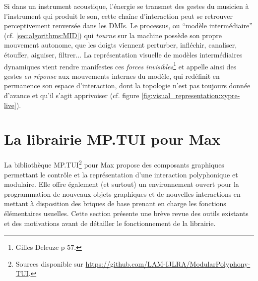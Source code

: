 \noindent Si dans un instrument acoustique, l'énergie se transmet des gestes du musicien à l'instrument qui produit le son, cette chaîne d'interaction peut se retrouver perceptivement renversée dans les \glspl{DMI}. Le processus, ou ``modèle intermédiaire'' (cf. \ref{sec:algorithms:MID}) qui \textit{tourne} sur la machine possède son propre mouvement autonome, que les doigts viennent perturber, infléchir, canaliser, étouffer, aiguiser, filtrer... La représentation visuelle de modèles intermédiaires dynamiques vient rendre manifestes ces \textit{forces invisibles}\footnote{ Gilles Deleuze \cite{deleuze_francis_1981} p 57.} et appelle ainsi des gestes \textit{en réponse} aux mouvements internes du modèle, qui redéfinit en permanence son espace d'interaction, dont la topologie n'est pas toujours donnée d'avance et qu'il s'agit apprivoiser (cf. figure \ref{fig:visual_representation:xypre-live}).




\section{La librairie MP.TUI pour Max}


\noindent La bibliothèque MP.TUI\footnote{Sources disponible sur \url{https://github.com/LAM-IJLRA/ModularPolyphony-TUI}.} pour Max propose des composants graphiques permettant le contrôle et la représentation d'une interaction polyphonique et modulaire. Elle offre également (et surtout) un environnement ouvert pour la programmation de nouveaux objets graphiques et de nouvelles interactions en mettant à disposition des briques de base prenant en charge les fonctions élémentaires usuelles. Cette section présente une brève revue des outils existants et des motivations avant de détailler le fonctionnement de la librairie.

